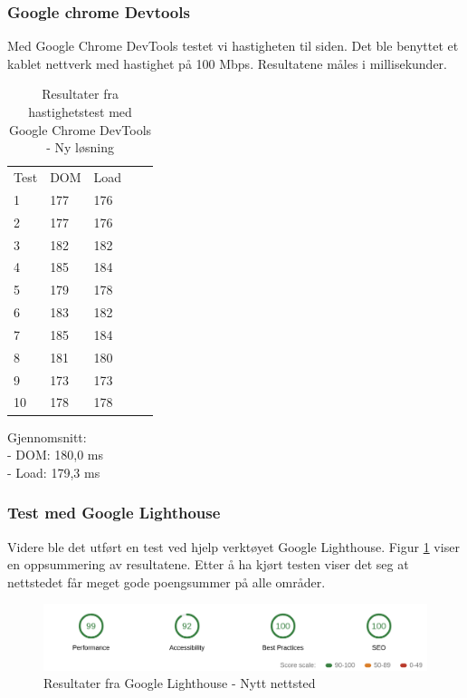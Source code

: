 \subsubsection{Google chrome Devtools}
Med Google Chrome DevTools testet vi hastigheten til siden. Det ble benyttet et kablet nettverk med hastighet på 100 Mbps. Resultatene måles i millisekunder.

\begin{table}[H]
\begin{center}
\begin{tabular}{lllll}
Test & DOM & Load &  &  \\
1 & 177 & 176 &  &  \\
2 & 177 & 176 &  &  \\
3 & 182 & 182 &  &  \\
4 & 185 & 184 &  &  \\
5 & 179 & 178 &  &  \\
6 & 183 & 182 &  &  \\
7 & 185 & 184 &  &  \\
8 & 181 & 180 &  &  \\
9 & 173 & 173 &  &  \\
10 & 178 & 178 &  &  \\
\end{tabular}
\end{center}
\caption{\label{tab:table-analysis-new-website}Resultater fra hastighetstest med Google Chrome DevTools - Ny løsning}
\end{table}

Gjennomsnitt:\\
- DOM: 180,0 ms\\
- Load: 179,3 ms

\subsubsection{Test med Google Lighthouse}
Videre ble det utført en test ved hjelp verktøyet Google Lighthouse. Figur \ref{fig:analysis-new-lightouse-summary} viser en oppsummering av resultatene. Etter å ha kjørt testen viser det seg at nettstedet får meget gode poengsummer på alle områder. 

\begin{figure}[H]
    \centering
    \includegraphics[width=\textwidth]{bjornar/Lighthouse-Report-mobile-new.png}
    \caption{Resultater fra Google Lighthouse - Nytt nettsted}
    \label{fig:analysis-new-lightouse-summary}
\end{figure}

